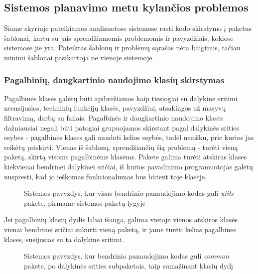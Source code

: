 \subsection{Sistemos planavimo metu kylančios problemos}
Šiame skyriuje pateikiamos analizuotose sistemose rasti kodo skirstymo į paketus šablonai, kartu su jais sprendžiamomis problemomis ir pavyzdžiais,
kokiose sistemose jie yra.
Pateiktas šablonų ir problemų sąrašas nėra baigtinis, tačiau minimi šablonai pasikartoja ne vienoje sistemoje.

\subsubsection{Pagalbinių, daugkartinio naudojimo klasių skirstymas}
Pagalbinės klasės galėtų būti apibrėžiamos kaip tiesiogiai su dalykine sritimi nesusijusios, techninių funkcijų klasės,
pavyzdžiui, atsakingos už masyvų filtravimą, darbą su failais.
Pagalbinės ir daugkartinio naudojimo klasės dažniausiai negali būti patogiai grupuojamos skirstant pagal dalykinės srities esybes - pagalbines klases gali
naudoti kelios esybės, todėl neaišku, prie kurios jas reikėtų priskirti.
Vienas iš šablonų, sprendžiančių šią problemą - turėti vieną paketą, skirtą visoms pagalbinėms klasėms.
Pakete galima turėti atskiras klases kiekvienai bendrinei dalykinei sričiai, iš kurios pavadinimo programuotojas galėtų nuspresti,
kad jo ieškomas funkcionalumas bus būtent toje klasėje.
\begin{figure}[H]
\snugshade
{}
\endsnugshade
\caption{Sistemos pavyzdys, kur visas bendrinio panaudojimo kodas guli \textit{utils} pakete, pirmame sistemos paketų lygyje}
\end{figure}
Jei pagalbinių klasių dydis labai išauga, galima vietoje vienos atskiros klasės vienai bendrinei sričiai sukurti vieną paketą,
ir jame turėti kelias pagalbines klases, susijusias su ta dalykine sritimi.
\begin{figure}[H]
\snugshade
{}
\endsnugshade
\caption{Sistemos pavyzdys, kur bendrinio panaudojimo kodas guli \textit{common} pakete, po dalykinės srities subpaketais, taip sumažinant klasių dydį }
\end{figure}
